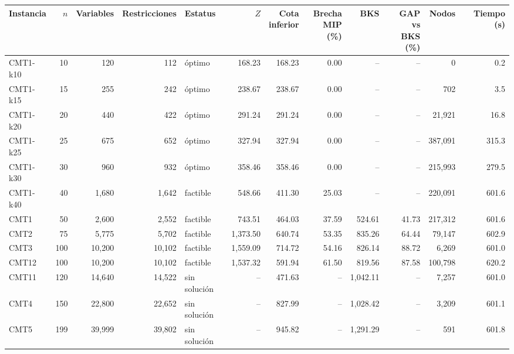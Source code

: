 \begin{tabular}{lrrrlrrrrrrr}
\toprule
Instancia & $n$ & Variables & Restricciones & Estatus & $Z$ & \makecell{Cota\\inferior} & \makecell{Brecha\\MIP (\%)} & BKS & \makecell{GAP vs\\BKS (\%)} & Nodos & Tiempo (s) \\
\midrule
CMT1-k10 & 10 & 120 & 112 & óptimo & 168.23 & 168.23 & 0.00 & -- & -- & 0 & 0.2 \\
CMT1-k15 & 15 & 255 & 242 & óptimo & 238.67 & 238.67 & 0.00 & -- & -- & 702 & 3.5 \\
CMT1-k20 & 20 & 440 & 422 & óptimo & 291.24 & 291.24 & 0.00 & -- & -- & 21,921 & 16.8 \\
CMT1-k25 & 25 & 675 & 652 & óptimo & 327.94 & 327.94 & 0.00 & -- & -- & 387,091 & 315.3 \\
CMT1-k30 & 30 & 960 & 932 & óptimo & 358.46 & 358.46 & 0.00 & -- & -- & 215,993 & 279.5 \\
CMT1-k40 & 40 & 1,680 & 1,642 & factible & 548.66 & 411.30 & 25.03 & -- & -- & 220,091 & 601.6 \\
\midrule
CMT1 & 50 & 2,600 & 2,552 & factible & 743.51 & 464.03 & 37.59 & 524.61 & 41.73 & 217,312 & 601.6 \\
CMT2 & 75 & 5,775 & 5,702 & factible & 1,373.50 & 640.74 & 53.35 & 835.26 & 64.44 & 79,147 & 602.9 \\
CMT3 & 100 & 10,200 & 10,102 & factible & 1,559.09 & 714.72 & 54.16 & 826.14 & 88.72 & 6,269 & 601.0 \\
CMT12 & 100 & 10,200 & 10,102 & factible & 1,537.32 & 591.94 & 61.50 & 819.56 & 87.58 & 100,798 & 620.2 \\
CMT11 & 120 & 14,640 & 14,522 & sin solución & -- & 471.63 & -- & 1,042.11 & -- & 7,257 & 601.0 \\
CMT4 & 150 & 22,800 & 22,652 & sin solución & -- & 827.99 & -- & 1,028.42 & -- & 3,209 & 601.1 \\
CMT5 & 199 & 39,999 & 39,802 & sin solución & -- & 945.82 & -- & 1,291.29 & -- & 591 & 601.8 \\
\bottomrule
\end{tabular}
